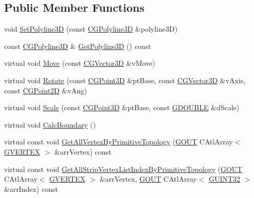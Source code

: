 \subsection*{Public Member Functions}
\begin{DoxyCompactItemize}
\item 
void \hyperlink{class_c_g_object_polyline3_d_a083e85a791bce70a331dfa8a9bff38d7}{Set\+Polyline3\+D} (const \hyperlink{class_c_g_polyline3_d}{C\+G\+Polyline3\+D} \&polyline3\+D)
\item 
const \hyperlink{class_c_g_polyline3_d}{C\+G\+Polyline3\+D} \& \hyperlink{class_c_g_object_polyline3_d_a212c9c0fa5f30d5127faeb4d94d8996b}{Get\+Polyline3\+D} () const 
\item 
virtual void \hyperlink{class_c_g_object_polyline3_d_acb7df7617116396c1c15e88ed3d10ccd}{Move} (const \hyperlink{_g_point3_d_8h_aa7e73d39f4c991acb5a13c84b498366d}{C\+G\+Vector3\+D} \&v\+Move)
\item 
virtual void \hyperlink{class_c_g_object_polyline3_d_a87e156fb02c91310d265d858eaa57638}{Rotate} (const \hyperlink{class_c_g_point3_d}{C\+G\+Point3\+D} \&pt\+Base, const \hyperlink{_g_point3_d_8h_aa7e73d39f4c991acb5a13c84b498366d}{C\+G\+Vector3\+D} \&v\+Axis, const \hyperlink{class_c_g_point2_d}{C\+G\+Point2\+D} \&v\+Ang)
\item 
virtual void \hyperlink{class_c_g_object_polyline3_d_af95160f95c89cc850b2f8ffa0e149aeb}{Scale} (const \hyperlink{class_c_g_point3_d}{C\+G\+Point3\+D} \&pt\+Base, const \hyperlink{_g_types_8h_afd05ac85f90ee8e2a733928545462cd4}{G\+D\+O\+U\+B\+L\+E} \&d\+Scale)
\item 
virtual void \hyperlink{class_c_g_object_polyline3_d_a59748499d43fc3685fe675839a0928ff}{Calc\+Boundary} ()
\item 
virtual const void \hyperlink{class_c_g_object_polyline3_d_affb038a509d8af7520db6b6d6f4f9783}{Get\+All\+Vertex\+By\+Primitive\+Topology} (\hyperlink{_g_types_8h_a0858ec221262e635612871d70ca233ad}{G\+O\+U\+T} C\+Atl\+Array$<$ \hyperlink{struct_g_v_e_r_t_e_x}{G\+V\+E\+R\+T\+E\+X} $>$ \&arr\+Vertex) const 
\item 
virtual const void \hyperlink{class_c_g_object_polyline3_d_a3ff13eb0fd06d82561f2e5cf0b18b2b5}{Get\+All\+Strip\+Vertex\+List\+Index\+By\+Primitive\+Topology} (\hyperlink{_g_types_8h_a0858ec221262e635612871d70ca233ad}{G\+O\+U\+T} C\+Atl\+Array$<$ \hyperlink{struct_g_v_e_r_t_e_x}{G\+V\+E\+R\+T\+E\+X} $>$ \&arr\+Vertex, \hyperlink{_g_types_8h_a0858ec221262e635612871d70ca233ad}{G\+O\+U\+T} C\+Atl\+Array$<$ \hyperlink{_g_types_8h_a2e1a1c77d1349057202e2f34e071019c}{G\+U\+I\+N\+T32} $>$ \&arr\+Index) const 

\end{DoxyCompactItemize}
